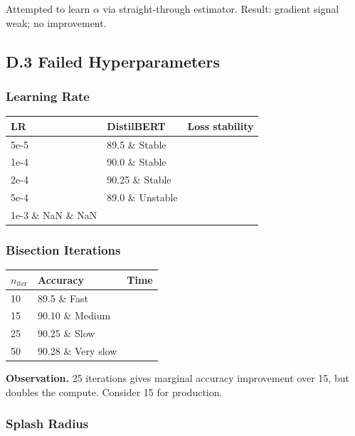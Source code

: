 Attempted to learn $\alpha$ via straight-through estimator. Result: gradient 
signal weak; no improvement.

\subsection{D.3 Failed Hyperparameters}

\subsubsection{Learning Rate}

\begin{table}[H]
\centering
\small
\begin{tabular}{lll}
\toprule
\textbf{LR} & \textbf{DistilBERT} & \textbf{Loss stability} \\
\midrule
5e-5 & 89.5 \& Stable \\
1e-4 & 90.0 \& Stable \\
2e-4 & 90.25 \& Stable \\
5e-4 & 89.0 \& Unstable \\
1e-3 \& NaN \& NaN \\
\bottomrule
\end{tabular}
\end{table}

\subsubsection{Bisection Iterations}

\begin{table}[H]
\centering
\small
\begin{tabular}{lll}
\toprule
\textbf{$n_\text{iter}$} & \textbf{Accuracy} & \textbf{Time} \\
\midrule
10 & 89.5 \& Fast \\
15 & 90.10 \& Medium \\
25 & 90.25 \& Slow \\
50 & 90.28 \& Very slow \\
\bottomrule
\end{tabular}
\end{table}

\textbf{Observation.} 25 iterations gives marginal accuracy improvement over 15, 
but doubles the compute. Consider 15 for production.

\subsubsection{Splash Radius}

